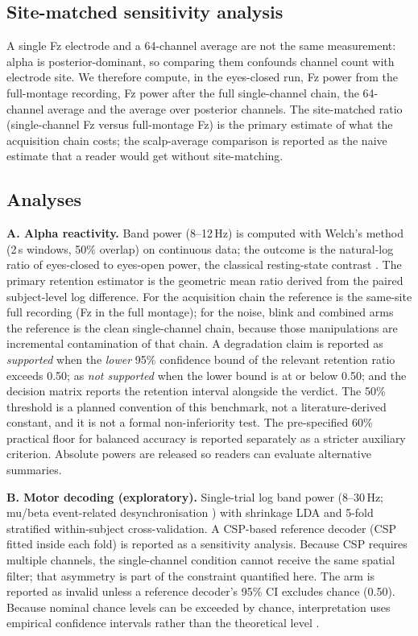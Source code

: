 \subsection*{Site-matched sensitivity analysis}
A single Fz electrode and a 64-channel average are not the same measurement: alpha is
posterior-dominant, so comparing them confounds channel count with electrode site. We
therefore compute, in the eyes-closed run, Fz power from the full-montage recording,
Fz power after the full single-channel chain, the 64-channel average and the average
over posterior channels. The site-matched ratio (single-channel Fz versus full-montage
Fz) is the primary estimate of what the acquisition chain costs; the scalp-average
comparison is reported as the naive estimate that a reader would get without
site-matching.

\subsection*{Analyses}
\textbf{A. Alpha reactivity.} Band power (8--12\,Hz) is computed with Welch's method
(2\,s windows, 50\% overlap) on continuous data; the outcome is the natural-log ratio
of eyes-closed to eyes-open power, the classical resting-state contrast
\citep{barry2007eyes}. The primary retention estimator is the geometric mean ratio derived from the paired
subject-level log difference. For the acquisition chain the reference is the same-site
full recording (Fz in the full montage); for the noise, blink and combined arms the
reference is the clean single-channel chain, because those manipulations are
incremental contamination of that chain. A degradation claim is reported as
\emph{supported} when the \emph{lower} 95\% confidence bound of the relevant retention
ratio exceeds 0.50; as \emph{not supported} when the lower bound is at or below 0.50;
and the decision matrix reports the retention interval alongside the verdict. The 50\% threshold is a planned
convention of this benchmark, not a literature-derived constant, and it is not a formal
non-inferiority test. The pre-specified 60\% practical floor for balanced accuracy is
reported separately as a stricter auxiliary criterion. Absolute powers are released so readers can evaluate alternative summaries.

\textbf{B. Motor decoding (exploratory).} Single-trial log band power (8--30\,Hz;
mu/beta event-related desynchronisation \citep{pfurtscheller1999erd}) with shrinkage
LDA and 5-fold stratified within-subject cross-validation. A CSP-based reference
decoder (CSP fitted inside each fold) is reported as a sensitivity analysis. Because
CSP requires multiple channels, the single-channel condition cannot receive the same
spatial filter; that asymmetry is part of the constraint quantified here. The arm is
reported as invalid unless a reference decoder's 95\% CI excludes chance (0.50).
Because nominal chance levels can be exceeded by chance, interpretation uses empirical
confidence intervals rather than the theoretical level
\citep{combrisson2015chance,billinger2012significance}.

